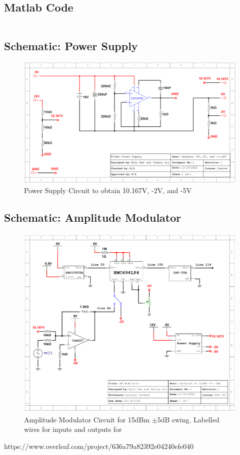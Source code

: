 \subsection{Matlab Code}


\inputminted[breaklines]{Matlab}{./Code/AmplitudeModulator.m}

\subsection{Schematic: Power Supply}
\begin{figure}[H]
    \centering
    \includegraphics[width = 1\textwidth]{Appendices/ESE342_Design1_Power_Supply.png}
    \caption{Power Supply Circuit to obtain 10.167V, -2V, and -5V}
    \label{fig:PowerSupply}
\end{figure}

\subsection{Schematic: Amplitude Modulator}
\begin{figure}[H]
    \centering
    \includegraphics[width = 1\textwidth]{ESE342_Design1.png}
    \caption{Amplitude Modulator Circuit for 15dBm $\pm$5dB swing. Labelled wires for inputs and outputs for }
    \label{fig:AMCircuit}
\end{figure}https://www.overleaf.com/project/636a79a82392e04240efe040

